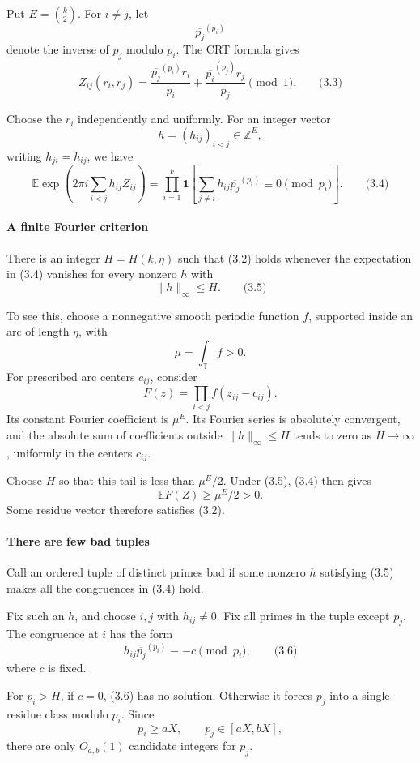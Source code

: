 \documentclass[
  11pt,
  a4paper,
]{article}
\begin{document}
Put \(E=\binom{k}{2}\). For \(i\ne j\), let \[
\overline{p_j}^{(p_i)}
\] denote the inverse of \(p_j\) modulo \(p_i\). The CRT formula gives
\[
Z_{ij}(r_i,r_j)
=
\frac{\overline{p_j}^{(p_i)}r_i}{p_i}
+
\frac{\overline{p_i}^{(p_j)}r_j}{p_j}
\pmod1.
\qquad\text{(3.3)}
\]

Choose the \(r_i\) independently and uniformly. For an integer vector \[
h=(h_{ij})_{i<j}\in\mathbb Z^E,
\] writing \(h_{ji}=h_{ij}\), we have \[
\mathbb E\exp\!\left(2\pi i\sum_{i<j}h_{ij}Z_{ij}\right)
=
\prod_{i=1}^k
\mathbf 1\!\left[
\sum_{j\ne i}h_{ij}\overline{p_j}^{(p_i)}
\equiv0\pmod{p_i}
\right].
\qquad\text{(3.4)}
\]

\paragraph{A finite Fourier criterion}\label{a-finite-fourier-criterion}

There is an integer \(H=H(k,\eta)\) such that (3.2) holds whenever the
expectation in (3.4) vanishes for every nonzero \(h\) with \[
\|h\|_\infty\le H.
\qquad\text{(3.5)}
\]

To see this, choose a nonnegative smooth periodic function \(f\),
supported inside an arc of length \(\eta\), with \[
\mu=\int_{\mathbb T}f>0.
\] For prescribed arc centers \(c_{ij}\), consider \[
F(z)=\prod_{i<j}f(z_{ij}-c_{ij}).
\] Its constant Fourier coefficient is \(\mu^E\). Its Fourier series is
absolutely convergent, and the absolute sum of coefficients outside
\(\|h\|_\infty\le H\) tends to zero as \(H\to\infty\), uniformly in the
centers \(c_{ij}\).

Choose \(H\) so that this tail is less than \(\mu^E/2\). Under (3.5),
(3.4) then gives \[
\mathbb EF(Z)\ge\mu^E/2>0.
\] Some residue vector therefore satisfies (3.2).

\paragraph{There are few bad tuples}\label{there-are-few-bad-tuples}

Call an ordered tuple of distinct primes bad if some nonzero \(h\)
satisfying (3.5) makes all the congruences in (3.4) hold.

Fix such an \(h\), and choose \(i,j\) with \(h_{ij}\ne0\). Fix all
primes in the tuple except \(p_j\). The congruence at \(i\) has the form
\[
h_{ij}\overline{p_j}^{(p_i)}\equiv-c\pmod{p_i},
\qquad\text{(3.6)}
\] where \(c\) is fixed.

For \(p_i>H\), if \(c=0\), (3.6) has no solution. Otherwise it forces
\(p_j\) into a single residue class modulo \(p_i\). Since \[
p_i\ge aX,\qquad p_j\in[aX,bX],
\] there are only \(O_{a,b}(1)\) candidate integers for \(p_j\).
\end{document}
